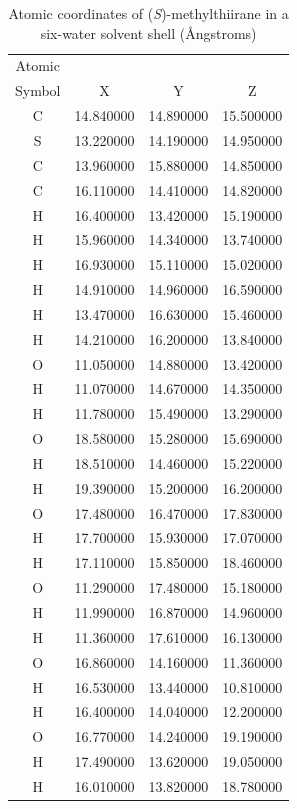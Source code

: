 \begin{table}
    \centering
    \caption{Atomic coordinates of (\textit{S})-methylthiirane in a six-water solvent shell
 (\AA ngstroms)}
    \label{metthi_6}
    \begin{tabular}{ c c c c }
    \hline
    \hline
    Atomic & & & \\
    Symbol & X & Y & Z \\
    \hline
	C &  14.840000 &  14.890000 &  15.500000 \\
	S &  13.220000 &  14.190000 &  14.950000 \\
	C &  13.960000 &  15.880000 &  14.850000 \\
	C &  16.110000 &  14.410000 &  14.820000 \\
	H &  16.400000 &  13.420000 &  15.190000 \\
	H &  15.960000 &  14.340000 &  13.740000 \\
	H &  16.930000 &  15.110000 &  15.020000 \\
	H &  14.910000 &  14.960000 &  16.590000 \\
	H &  13.470000 &  16.630000 &  15.460000 \\
	H &  14.210000 &  16.200000 &  13.840000 \\
	O &  11.050000 &  14.880000 &  13.420000 \\
	H &  11.070000 &  14.670000 &  14.350000 \\
	H &  11.780000 &  15.490000 &  13.290000 \\
	O &  18.580000 &  15.280000 &  15.690000 \\
	H &  18.510000 &  14.460000 &  15.220000 \\
	H &  19.390000 &  15.200000 &  16.200000 \\
	O &  17.480000 &  16.470000 &  17.830000 \\
	H &  17.700000 &  15.930000 &  17.070000 \\
	H &  17.110000 &  15.850000 &  18.460000 \\
	O &  11.290000 &  17.480000 &  15.180000 \\
	H &  11.990000 &  16.870000 &  14.960000 \\
	H &  11.360000 &  17.610000 &  16.130000 \\
	O &  16.860000 &  14.160000 &  11.360000 \\
	H &  16.530000 &  13.440000 &  10.810000 \\
	H &  16.400000 &  14.040000 &  12.200000 \\
	O &  16.770000 &  14.240000 &  19.190000 \\
	H &  17.490000 &  13.620000 &  19.050000 \\
	H &  16.010000 &  13.820000 &  18.780000 \\
    \hline
    \hline
    \end{tabular}
\end{table}
